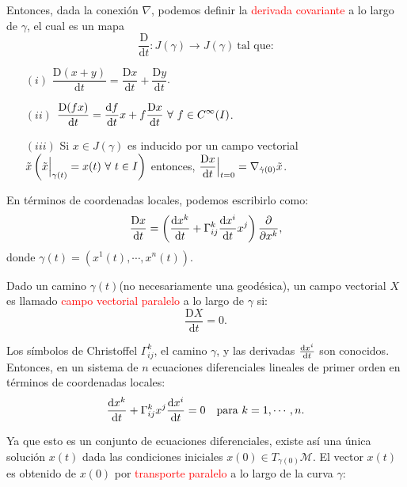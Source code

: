 \documentclass[../main]{subfiles}
\begin{document}
Entonces, dada la conexión $\nabla$, podemos definir la \textcolor{red}{derivada covariante} a lo largo de $\gamma$, el cual es un mapa 
\begin{equation}
    \dfrac{\mathrm{D}}{\mathrm{d}t}: J(\gamma)\rightarrow J(\gamma) \ \text{tal que:}
\end{equation}
\begin{enumerate}
    \item[$(i)$] $\displaystyle \dfrac{\mathrm{D} (x+y)}{\mathrm{d}t}=\dfrac{\mathrm{D}x}{\mathrm{d}t}+\dfrac{\mathrm{D}y}{\mathrm{d}t}$.
    \item[$(ii)$] $\displaystyle \dfrac{\mathrm{D}(fx)}{\mathrm{d}t}=\dv{f}{t}x+f\dfrac{\mathrm{D}x}{\mathrm{d}t} \ \forall \ f\in C^{\infty}(I)$.
    \item[$(iii)$] Si $x \in J(\gamma)$ es inducido por un campo vectorial $\displaystyle \tilde{x}\left(\tilde{x}\Big{|}_{\gamma(t)}=x(t) \ \forall \ t\in I\right)$ entonces, $\displaystyle \dfrac{\mathrm{D}x}{\mathrm{d}t}\Big{|}_{t=0}=\nabla_{\dot{\gamma}(0)}\tilde{x}$.   
\end{enumerate}

En términos de coordenadas locales, podemos escribirlo como:
\begin{equation}
    \dfrac{\mathrm{D}x}{\mathrm{d}t}=\left(\dv{x^k}{t}+\Gamma^k_{ij}\dv{x^{i}}{t}x^j\right)\pdv{}{x^k},
\end{equation}
donde $\gamma(t)=(x^1(t), \cdots, x^n(t))$.

Dado un camino $\gamma(t)$(no necesariamente una geodésica), un campo vectorial $X$ es llamado \textcolor{red}{campo vectorial paralelo} a lo largo de $\gamma$ si:
\begin{equation}
    \dfrac{\mathrm{D}X}{\mathrm{d}t}=0.
\end{equation}

Los símbolos de Christoffel $\Gamma^k_{ij}$, el camino $\gamma$, y las derivadas $\dv{x^{i}}{t}$ son conocidos. Entonces, en un sistema de $n$ ecuaciones diferenciales lineales de primer orden en términos de coordenadas locales:
\begin{equation}
    \dv{x^k}{t}+\Gamma^k_{ij}x^j \dv{x^{i}}{t}=0 \quad \text{para} \ k=1, \cdots, n.
\end{equation}

Ya que esto es un conjunto de ecuaciones diferenciales, existe así una única solución $x(t)$ dada las condiciones iniciales $x(0) \in T_{\gamma(0)}\mathcal{M}$. El vector $x(t)$ es obtenido de $x(0)$ por \textcolor{red}{transporte paralelo} a lo largo de la curva $\gamma$:
\end{document}
